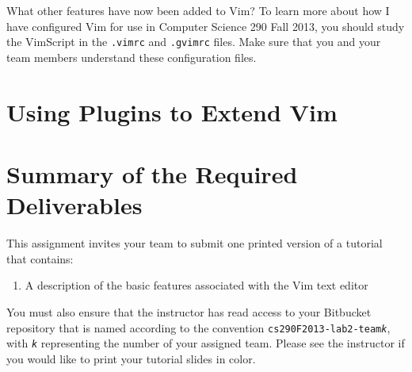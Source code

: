 What other features have now been added to Vim?  To learn more about how I have configured Vim for use in Computer
Science 290 Fall 2013, you should study the VimScript in the {\tt .vimrc} and {\tt .gvimrc} files.  Make sure that you
and your team members understand these configuration files.

\section*{Using Plugins to Extend Vim}


\section*{Summary of the Required Deliverables}

This assignment invites your team to submit one printed version of a tutorial that contains:

\begin{enumerate}
	
	\item A description of the basic features associated with the Vim text editor

\end{enumerate}

You must also ensure that the instructor has read access to your Bitbucket repository that is named according to the
convention {\tt cs290F2013-lab2-team{\em k}}, with {\tt {\em k}} representing the number of your assigned team. Please
see the instructor if you would like to print your tutorial slides in color.


